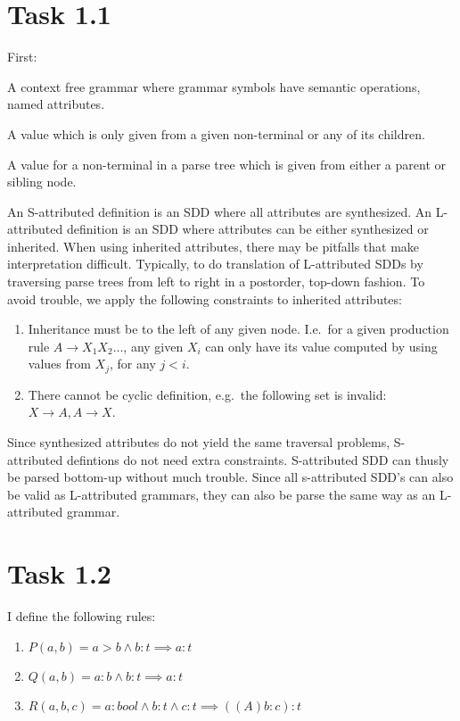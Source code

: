 \section*{Task 1.1}
First:\
\begin{definition}
    A context free grammar where grammar symbols have semantic operations, named attributes.
\end{definition}
\begin{definition}
    A value which is only given from a given non-terminal or any of its children.
\end{definition}
\begin{definition}
    A value for a non-terminal in a parse tree which is given from either a parent or sibling node.
\end{definition}

An S-attributed definition is an SDD where all attributes are synthesized.
An L-attributed definition is an SDD where attributes can be either synthesized or 
inherited. When using inherited attributes, there may be pitfalls that make interpretation difficult.  Typically, to do translation of L-attributed SDDs by traversing parse trees from left to right in a postorder, top-down fashion. 
To avoid trouble, we apply the following constraints to inherited attributes:
\begin{enumerate}
    \item Inheritance must be to the left of any given node. I.e.\ for a given
    production rule $A \rightarrow X_{1}X_{2}\dots$, any given $X_{i}$ can only
    have its value computed by using values from $X_{j}$, for any $j < i$.
    \item There cannot be cyclic definition, e.g.\ the following set is invalid:
    $X \rightarrow A, A \rightarrow X$.
\end{enumerate}

\noindent Since synthesized attributes do not yield the same traversal problems, S-attributed
defintions do not need extra constraints. S-attributed SDD can thusly be parsed bottom-up without much trouble. Since all s-attributed SDD's can also be valid as L-attributed grammars, they can also be parse the same way as an L-attributed grammar.


\section*{Task 1.2}
I define the following rules:
\begin{enumerate}
    \item $P(a,b) = a > b \wedge b:t \implies a:t$
    \item $Q(a,b) = a : b \wedge b:t \implies a:t$
    \item $R(a,b,c) = a:bool \wedge b:t \wedge c:t \implies ((A) b : c) : t$
\end{enumerate}

